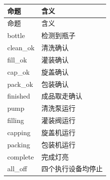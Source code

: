 \begin{longtable}{L{3.3cm}L{10.0cm}}

\toprule

命题 & 含义\\

\midrule

\endfirsthead

\toprule

命题 & 含义\\

\midrule

\endhead

{\ttfamily bottle} & 检测到瓶子\\

{\ttfamily clean\_ok} & 清洗确认\\

{\ttfamily fill\_ok} & 灌装确认\\

{\ttfamily cap\_ok} & 旋盖确认\\

{\ttfamily pack\_ok} & 包装确认\\

{\ttfamily finished} & 成品取走确认\\

{\ttfamily pump} & 清洗泵运行\\

{\ttfamily filling} & 灌装阀运行\\

{\ttfamily capping} & 旋盖机运行\\

{\ttfamily packing} & 包装机运行\\

{\ttfamily complete} & 完成灯亮\\

{\ttfamily all\_off} & 四个执行设备均停止\\

\bottomrule

\end{longtable}


